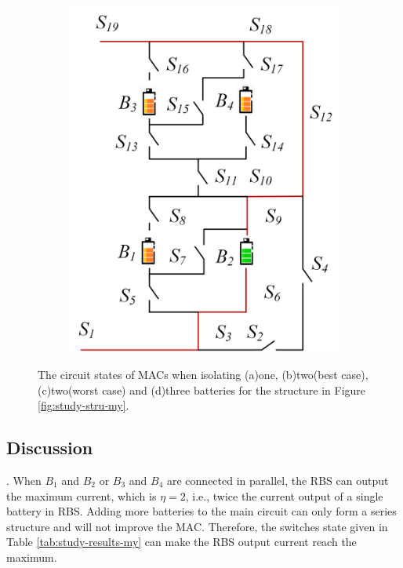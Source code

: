 \documentclass{article}
\begin{document}
\begin{figure}[htbp]
\begin{subfigure}[b]{0.31\textwidth}
          \includegraphics[width=\textwidth]{my-isolated-3.png}
          \caption{}
          \label{fig:my-isolated-3}
      \end{subfigure}
      \caption{
          The circuit states of MACs when isolating (a)one, (b)two(best case), (c)two(worst case) and (d)three batteries for the structure in Figure \ref{fig:study-stru-my}.
          }
  \end{figure}

\subsection{Discussion}

.
When $B_1$ and $B_2$ or $B_3$ and $B_4$ are connected in parallel, the RBS can output the maximum current, which is $\eta=2$, i.e., twice the current output of a single battery in RBS. 
Adding more batteries to the main circuit can only form a series structure and will not improve the MAC. 
Therefore, the switches state given in Table \ref{tab:study-results-my} can make the RBS output current reach the maximum.
\end{document}
